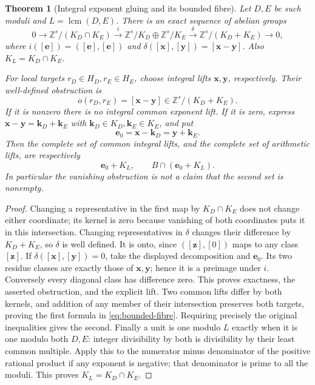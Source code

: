 \documentclass[11pt]{article}
\newtheorem{theorem}{Theorem}[section]
\theoremstyle{definition}\newtheorem{definition}[theorem]{Definition}
\theoremstyle{remark}\newtheorem{remark}[theorem]{Remark}
\DeclareMathOperator{\lcm}{lcm}
\newcommand{\Z}{\mathbb Z}\newcommand{\Q}{\mathbb Q}
\begin{document}
\begin{theorem}[Integral exponent gluing and its bounded fibre]\label{thm:glue}
Let \(D,E\) be such moduli and \(L=\lcm(D,E)\).
There is an exact sequence of abelian groups
\begin{equation}\label{eq:lattice-exact}
 0\longrightarrow\Z^s/(K_D\cap K_E)
 \xrightarrow{\ i\ }\Z^s/K_D\oplus\Z^s/K_E
 \xrightarrow{\ \delta\ }\Z^s/(K_D+K_E)\longrightarrow0 ,
\end{equation}
where \(i([\boldsymbol e])=([\boldsymbol e],[\boldsymbol e])\)
and \(\delta([\boldsymbol x],[\boldsymbol y])
=[\boldsymbol x-\boldsymbol y]\).  Also \(K_L=K_D\cap K_E\).

For local targets \(r_D\in H_D,r_E\in H_E\), choose integral
lifts \(\boldsymbol x,\boldsymbol y\), respectively.  Their
well-defined obstruction is
\[
 o(r_D,r_E)=[\boldsymbol x-\boldsymbol y]\in
                        \Z^s/(K_D+K_E).
\]
If it is nonzero there is no integral common exponent lift.
If it is zero, express \(\boldsymbol x-\boldsymbol y
=\boldsymbol k_D+\boldsymbol k_E\) with
\(\boldsymbol k_D\in K_D,\boldsymbol k_E\in K_E\), and put
\[
 \boldsymbol e_0=\boldsymbol x-\boldsymbol k_D
                  =\boldsymbol y+\boldsymbol k_E.
\]
Then the complete set of common integral lifts, and the complete
set of arithmetic lifts, are respectively
\begin{equation}\label{eq:bounded-fibre}
 \boldsymbol e_0+K_L,\qquad
 B\cap(\boldsymbol e_0+K_L).
\end{equation}
In particular the vanishing obstruction is not a claim that the
second set is nonempty.
\end{theorem}
\begin{proof}
Changing a representative in the first map by \(K_D\cap K_E\)
does not change either coordinate; its kernel is zero because
vanishing of both coordinates puts it in this intersection.
Changing representatives in \(\delta\) changes their difference
by \(K_D+K_E\), so \(\delta\) is well defined.  It is onto, since
\(([\boldsymbol z],[0])\) maps to any class \([\boldsymbol z]\).
If \(\delta([\boldsymbol x],[\boldsymbol y])=0\), take the displayed
decomposition and \(\boldsymbol e_0\).  Its two residue classes
are exactly those of \(\boldsymbol x,\boldsymbol y\); hence it
is a preimage under \(i\).  Conversely every diagonal class has
difference zero.  This proves exactness, the asserted obstruction,
and the explicit lift.  Two common lifts differ by both kernels,
and addition of any member of their intersection preserves both
targets, proving the first formula in \eqref{eq:bounded-fibre}.
Requiring precisely the original inequalities gives the second.
Finally a unit is one modulo \(L\) exactly when it is one modulo
both \(D,E\): integer divisibility by both is divisibility by
their least common multiple.  Apply this to the numerator minus
denominator of the positive rational product if any exponent is
negative; that denominator is prime to all the moduli.  This
proves \(K_L=K_D\cap K_E\).
\end{proof}
\end{document}
